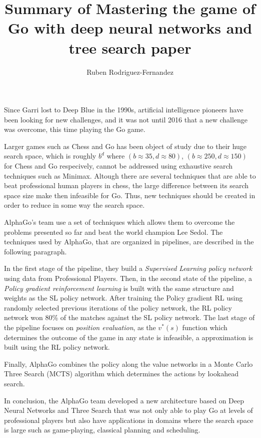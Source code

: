 \documentclass[10pt,a4paper]{article}
\title{Summary of Mastering the game of Go with deep neural networks and tree search paper}
\author{Ruben Rodriguez-Fernandez}
\begin{document}
\maketitle
Since Garri lost to Deep Blue in the 1990s, artificial intelligence pioneers have been looking for new challenges, and it was not until 2016 that a new challenge was overcome, this time playing the Go game.\newline


Larger games such as Chess and Go has been object of study due to their huge search space, which is roughly $b^{d}$ where $(b \approx 35, d \approx 80)$, $(b \approx 250, d \approx 150)$ for Chess and Go respecively, cannot be addressed using exhaustive search techniques such as Minimax. Altough there are several techniques that are able to beat professional human players in chess, the large difference between its search space size make then infeasible for Go. Thus, new techniques should be created in order to reduce in some way the search space.\newline

AlphaGo's team use a set of techniques which allows them to overcome the problems presented so far and beat the world champion Lee Sedol. The techniques used by AlphaGo, that are organized in pipelines, are described in the following paragraph.\newline

In the first stage of the pipeline, they build a \textit{Supervised Learning policy network} using data from Professional Players. Then, in the second state of the pipeline, a \textit{Policy gradient reinforcement learning} is built with the same structure and weights as the SL policy network. After training the Policy gradient RL using randomly selected previous iterations of the policy network, the RL policy network won 80\% of the matches against the SL policy network. The last stage of the pipeline focuses on \textit{position evaluation}, as the $v^{*}(s)$ function which determines the outcome of the game in any state is infeasible, a approximation is built using the RL policy network.\newline

Finally, AlphaGo combines the policy along the value networks in a Monte Carlo Three Search (MCTS) algorithm which determines the actions by lookahead search.\newline

In conclusion, the AlphaGo team developed a new architecture based on Deep Neural Networks and Three Search that was not only able to play Go at levels of professional players but also have applications in domains where the search space is large such as game-playing, classical planning and scheduling.
\end{document}
